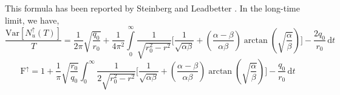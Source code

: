 \documentclass[journal]{IEEEtran}
\theoremstyle{plain}
\theoremstyle{definition}
\theoremstyle{remark}
\newcommand{\FFup}{\mathrm{F}^\uparrow}
\newcommand{\Nup}{N_u^{\uparrow}(T)}
\newcommand{\dd}{\mathrm{d}}
\newcommand{\Var}{\text{Var}}
\begin{document}
This formula has been reported by Steinberg \cite{steinberg1955short} and Leadbetter \cite{leadbetter1965variance}. In the long-time limit, we have,
\begin{equation}
    \frac{\Var\left[\Nup\right]}{T} =\frac{1}{2\pi}\sqrt{\frac{q_0}{r_0}} + \frac{1}{4\pi^2}\int\limits_{0}^\infty  \frac{1}{\sqrt{r_0^2-r^2}}\Biggl[\frac{1}{\sqrt{\alpha\beta}} + \left(\frac{\alpha - \beta}{\alpha\beta}\right) \arctan\left(\sqrt{\frac{\alpha}{\beta}}\right)\Biggr] - \frac{2q_0}{r_0}  \, \dd t
\end{equation}
\begin{equation}
    \FFup = 1 +\frac{1}{\pi} \sqrt{\frac{r_0}{q_0}} \int_{0}^\infty \frac{1}{2\sqrt{r_0^2-r^2}}\Biggl[\frac{1}{\sqrt{\alpha\beta}} + \left(\frac{\alpha - \beta}{\alpha\beta}\right) \arctan\left(\sqrt{\frac{\alpha}{\beta}}\right)\Biggr] - \frac{q_0}{r_0} \, \dd t
\end{equation}
\end{document}
